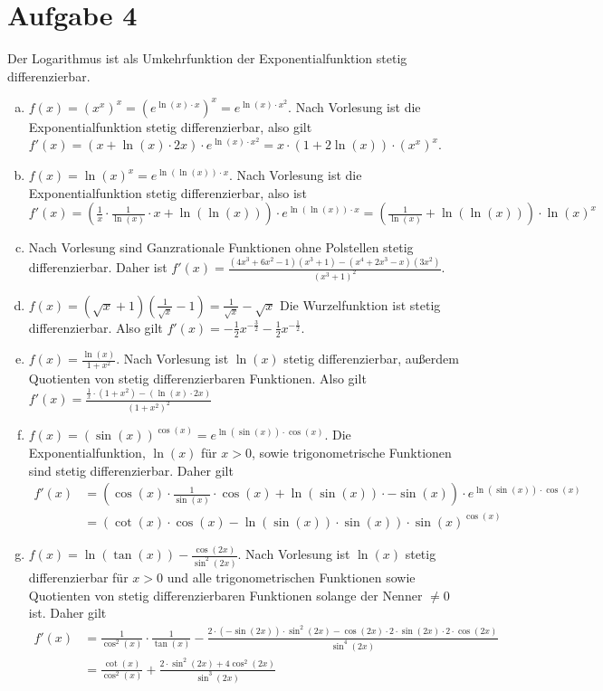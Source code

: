 \documentclass{article}
\begin{document}
    \section*{Aufgabe 4}
    Der Logarithmus ist als Umkehrfunktion der Exponentialfunktion stetig differenzierbar.
    \begin{enumerate}[(a)]
        \item $f(x) = (x^x)^x = (e^{\ln(x)\cdot x})^x = e^{\ln(x) \cdot x^2}$. Nach Vorlesung ist die Exponentialfunktion stetig differenzierbar, also gilt $f'(x) = (x + \ln(x) \cdot 2x) \cdot e^{\ln(x) \cdot x^2} = x \cdot (1 + 2 \ln(x)) \cdot (x^x)^x$.
        \item $f(x) = \ln(x)^x = e^{\ln(\ln(x))\cdot x}$. Nach Vorlesung ist die Exponentialfunktion stetig differenzierbar, also ist $f'(x) = \left(\frac{1}{x} \cdot \frac{1}{\ln(x)} \cdot x + \ln(\ln(x))\right) \cdot e^{\ln(\ln(x))\cdot x} = \left(\frac{1}{\ln(x)} + \ln(\ln(x))\right) \cdot \ln(x)^x$
        \item Nach Vorlesung sind Ganzrationale Funktionen ohne Polstellen stetig differenzierbar. Daher ist $f'(x) = \frac{(4x^3 + 6x^2 -1)(x^3 + 1) - (x^4 + 2x^3 -x)(3x^2)}{(x^3 + 1)^2}$.
        \item $f(x) = (\sqrt{x} + 1)\left(\frac{1}{\sqrt{x}}-1\right) = \frac{1}{\sqrt{x}} - \sqrt{x}$ Die Wurzelfunktion ist stetig differenzierbar. Also gilt $f'(x) = -\frac{1}{2}x^{-\frac{3}{2}} - \frac{1}{2} x^{-\frac{1}{2}}$.
        \item $f(x) = \frac{\ln(x)}{1+x^2}$. Nach Vorlesung ist $\ln(x)$ stetig differenzierbar, außerdem Quotienten von stetig differenzierbaren Funktionen. Also gilt $f'(x) = \frac{\frac{1}{x} \cdot (1 + x^2) - (\ln(x) \cdot 2x)}{(1 + x^2)^2}$
        \item $f(x) = (\sin(x))^{\cos(x)} = e^{\ln(\sin(x)) \cdot \cos(x)}$. Die Exponentialfunktion, $\ln(x)$ für $x > 0$, sowie trigonometrische Funktionen sind stetig differenzierbar. Daher gilt 
        \begin{align*}
            f'(x) &= \left(\cos(x) \cdot \frac{1}{\sin(x)} \cdot \cos(x) + \ln(\sin(x)) \cdot -\sin(x)\right) \cdot e^{\ln(\sin(x)) \cdot \cos(x)}\\
            &=\left(\cot(x) \cdot \cos(x) - \ln(\sin(x)) \cdot \sin(x)\right) \cdot \sin(x)^{\cos(x)}
        \end{align*}
        \item $f(x) = \ln(\tan(x)) - \frac{\cos(2x)}{\sin^2(2x)}$. Nach Vorlesung ist $\ln(x)$ stetig differenzierbar für $x > 0$ und alle trigonometrischen Funktionen sowie Quotienten von stetig differenzierbaren Funktionen solange der Nenner $\neq 0$ ist. Daher gilt 
        \begin{align*}
            f'(x) &= \frac{1}{\cos^2(x)} \cdot \frac{1}{\tan(x)} - \frac{2 \cdot (-\sin(2x)) \cdot \sin^2(2x) - \cos(2x) \cdot 2 \cdot \sin(2x) \cdot 2 \cdot \cos(2x)}{\sin^4(2x)}\\
            &= \frac{\cot(x)}{\cos^2(x)} + \frac{2 \cdot \sin^2(2x) + 4 \cos^2(2x)}{\sin^3(2x)}
        \end{align*}
    \end{enumerate}
\end{document}
